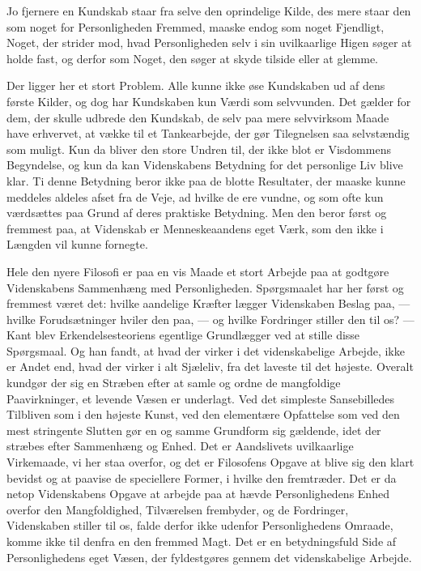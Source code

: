 \documentclass[12pt,a4paper,openany]{book}
\newcommand{\opage}[1]{\marginnote{\footnotesize\textit{[#1]}}}
\begin{document}
Jo fjernere en Kundskab staar fra selve den oprindelige
Kilde, des mere staar den som noget for Personligheden Fremmed,
maaske endog som noget Fjendligt, Noget, der strider
mod, hvad Personligheden selv i sin uvilkaarlige Higen søger
at holde fast, og derfor som Noget, den søger at skyde tilside
eller at glemme.

Der ligger her et stort Problem. Alle kunne ikke øse
Kundskaben ud af dens første Kilder, og dog har Kundskaben
kun Værdi som selvvunden. Det gælder for dem, der skulle
udbrede den Kundskab, de selv paa mere selvvirksom Maade
\setcounter{footnote}{0}%
\opage{5}have erhvervet, at vække til et Tankearbejde, der gør Tilegnelsen
saa selvstændig som muligt. Kun da bliver den store
Undren til, der ikke blot er Visdommens Begyndelse, og kun
da kan Videnskabens Betydning for det personlige Liv blive
klar. Ti denne Betydning beror ikke paa de blotte Resultater,
der maaske kunne meddeles aldeles afset fra de Veje, ad hvilke
de ere vundne, og som ofte kun værdsættes paa Grund af
deres praktiske Betydning. Men den beror først og fremmest
paa, at Videnskab er Menneskeaandens eget Værk, som den
ikke i Længden vil kunne fornegte.

Hele den nyere Filosofi er paa en vis Maade et stort Arbejde
paa at godtgøre Videnskabens Sammenhæng med Personligheden.
Spørgsmaalet har her først og fremmest været det:
hvilke aandelige Kræfter lægger Videnskaben Beslag paa,
--- hvilke Forudsætninger hviler den paa, --- og hvilke Fordringer
stiller den til os? --- Kant blev Erkendelsesteoriens egentlige
Grundlægger ved at stille disse Spørgsmaal. Og han fandt, at
hvad der virker i det videnskabelige Arbejde, ikke er Andet
end, hvad der virker i alt Sjæleliv, fra det laveste til det højeste.
Overalt kundgør der sig en Stræben efter at samle og
ordne de mangfoldige Paavirkninger, et levende Væsen er
underlagt. Ved det simpleste Sansebilledes Tilbliven som i den
højeste Kunst, ved den elementære Opfattelse som ved den
mest stringente Slutten gør en og samme Grundform sig gældende,
idet der stræbes efter Sammenhæng og Enhed. Det er
Aandslivets uvilkaarlige Virkemaade, vi her staa overfor, og
det er Filosofens Opgave at blive sig den klart bevidst og at
paavise de speciellere Former, i hvilke den fremtræder. Det
er da netop Videnskabens Opgave at arbejde paa at hævde
Personlighedens Enhed overfor den Mangfoldighed, Tilværelsen
frembyder, og de Fordringer, Videnskaben stiller til os, falde
derfor ikke udenfor Personlighedens Omraade, komme ikke til
denfra en den fremmed Magt. Det er en betydningsfuld Side af
Personlighedens eget Væsen, der fyldestgøres gennem det videnskabelige
Arbejde.
\end{document}
